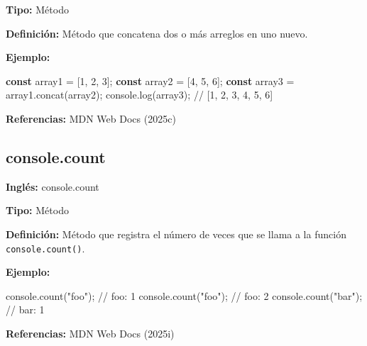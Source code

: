 \documentclass[
  letterpaper,
  DIV=11,
  numbers=noendperiod]{scrreprt}
\newenvironment{Shaded}{\begin{snugshade}}{\end{snugshade}}
\newcommand{\BuiltInTok}[1]{\textcolor[rgb]{0.00,0.23,0.31}{#1}}
\newcommand{\CommentTok}[1]{\textcolor[rgb]{0.37,0.37,0.37}{#1}}
\newcommand{\DecValTok}[1]{\textcolor[rgb]{0.68,0.00,0.00}{#1}}
\newcommand{\FunctionTok}[1]{\textcolor[rgb]{0.28,0.35,0.67}{#1}}
\newcommand{\KeywordTok}[1]{\textcolor[rgb]{0.00,0.23,0.31}{\textbf{#1}}}
\newcommand{\NormalTok}[1]{\textcolor[rgb]{0.00,0.23,0.31}{#1}}
\newcommand{\OperatorTok}[1]{\textcolor[rgb]{0.37,0.37,0.37}{#1}}
\newcommand{\StringTok}[1]{\textcolor[rgb]{0.13,0.47,0.30}{#1}}
\let\oldsubsection\subsection
\renewcommand{\subsection}{\phantomsection\oldsubsection}
\begin{document}
\textbf{Tipo:} Método

\textbf{Definición:} Método que concatena dos o más arreglos en uno
nuevo.

\textbf{Ejemplo:}

\begin{Shaded}
\begin{Highlighting}[]
\KeywordTok{const}\NormalTok{ array1 }\OperatorTok{=}\NormalTok{ [}\DecValTok{1}\OperatorTok{,} \DecValTok{2}\OperatorTok{,} \DecValTok{3}\NormalTok{]}\OperatorTok{;}
\KeywordTok{const}\NormalTok{ array2 }\OperatorTok{=}\NormalTok{ [}\DecValTok{4}\OperatorTok{,} \DecValTok{5}\OperatorTok{,} \DecValTok{6}\NormalTok{]}\OperatorTok{;}
\KeywordTok{const}\NormalTok{ array3 }\OperatorTok{=}\NormalTok{ array1}\OperatorTok{.}\FunctionTok{concat}\NormalTok{(array2)}\OperatorTok{;}
\BuiltInTok{console}\OperatorTok{.}\FunctionTok{log}\NormalTok{(array3)}\OperatorTok{;} \CommentTok{// [1, 2, 3, 4, 5, 6]}
\end{Highlighting}
\end{Shaded}

\textbf{Referencias:} MDN Web Docs (2025c)

\subsection*{console.count}\label{glos-console_count}

\textbf{Inglés:} console.count

\textbf{Tipo:} Método

\textbf{Definición:} Método que registra el número de veces que se llama
a la función \texttt{console.count()}.

\textbf{Ejemplo:}

\begin{Shaded}
\begin{Highlighting}[]
\BuiltInTok{console}\OperatorTok{.}\FunctionTok{count}\NormalTok{(}\StringTok{"foo"}\NormalTok{)}\OperatorTok{;} \CommentTok{// foo: 1}
\BuiltInTok{console}\OperatorTok{.}\FunctionTok{count}\NormalTok{(}\StringTok{"foo"}\NormalTok{)}\OperatorTok{;} \CommentTok{// foo: 2}
\BuiltInTok{console}\OperatorTok{.}\FunctionTok{count}\NormalTok{(}\StringTok{"bar"}\NormalTok{)}\OperatorTok{;} \CommentTok{// bar: 1}
\end{Highlighting}
\end{Shaded}

\textbf{Referencias:} MDN Web Docs (2025i)
\end{document}
